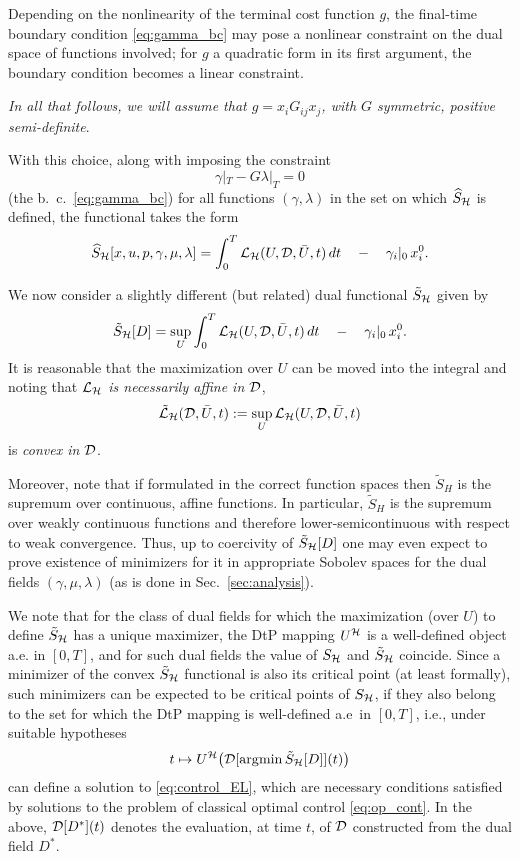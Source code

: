 \documentclass[11pt]{article}
\begin{document}
Depending on the nonlinearity of the terminal cost function $g$, the final-time boundary condition \eqref{eq:gamma_bc} may pose a nonlinear constraint on the dual space of functions involved; for $g$ a quadratic form in its first argument, the boundary condition becomes a linear constraint.

\emph{In all that follows, we will assume that $g = x_i G_{ij} x_j$, with $G$ symmetric, positive semi-definite}.

With this choice, along with imposing the constraint 
\begin{equation}\label{eq:linear_dual_bc}
\gamma|_T - G \lambda|_T = 0
\end{equation}
(the b.~c.~\eqref{eq:gamma_bc}) for all functions $(\gamma, \lambda)$ in the set on which $\widehat{S}_{\mathcal{H}}$ is defined, the functional takes the form
\[
\widehat{S}_{\mathcal{H}}[x,u,p, \gamma, \mu, \lambda] = \int_0^T \mathcal{L}_{\mathcal{H}}(U,\mathcal{D}, \bar{U}, t) \,dt \quad - \quad \gamma_i|_0 \, x^0_i.
\]

We now consider a slightly different (but related) dual functional $\tilde{S}_{\mathcal{H}}$ given by
\begin{equation}
    \tilde{S}_{\mathcal{H}}[D] = \sup_U \int_0^T \mathcal{L}_{\mathcal{H}} (U,\mathcal{D}, \bar{U}, t) \,dt \quad - \quad \gamma_i|_0 \, x^0_i.
\end{equation}
It is reasonable that the maximization over $U$ can be moved into the integral and noting that \emph{ $\mathcal{L}_{\mathcal{H}}$ is necessarily affine in $\mathcal{D}$},
\[
\tilde{\mathcal{L}}_{\mathcal{H}} (\mathcal{D}, \bar{U}, t) := \sup_U \mathcal{L}_{\mathcal{H}} (U,\mathcal{D}, \bar{U}, t)
\]
is \emph{convex in $\mathcal{D}$}.

Moreover, note that if formulated in the correct function spaces then $\tilde{S}_H$ is the supremum over continuous, affine functions. In particular, $\tilde{S}_H$ is the supremum over weakly continuous functions and therefore lower-semicontinuous with respect to weak convergence. Thus, up to coercivity of $\tilde{S}_{\mathcal{H}}[D]$ one may even expect to prove existence of minimizers for it in appropriate Sobolev spaces for the dual fields $(\gamma, \mu, \lambda)$ (as is done in Sec.~\ref{sec:analysis}). 

We note that for the class of dual fields for which the maximization (over $U$) to define $\tilde{S}_{\mathcal{H}}$ has a unique maximizer, the DtP mapping $U^{\mathcal{H}}$ is a well-defined object a.e. in $[0,T]$, and for such dual fields the value of $S_{\mathcal{H}}$ and $\tilde{S}_{\mathcal{H}}$ coincide. Since a minimizer of the convex $\tilde{S}_{\mathcal{H}}$ functional is also its critical point (at least formally), such minimizers can be expected to be critical points of $S_{\mathcal{H}}$, if they also belong to the set for which the DtP mapping is well-defined a.e~in $[0,T]$, i.e., under suitable hypotheses
\[
t \mapsto U^{\mathcal{H}}\big(\mathcal{D}[{\arg\!\min} \, \tilde{S}_{\mathcal{H}}[D]](t)\big)
\]
can define a solution to \eqref{eq:control_EL}, which are necessary conditions satisfied by solutions to the problem of classical optimal control \eqref{eq:op_cont}. In the above, $\mathcal{D}[D^*](t)$ denotes the evaluation, at time $t$, of $\mathcal{D}$ constructed from the dual field $D^*$.
\end{document}
